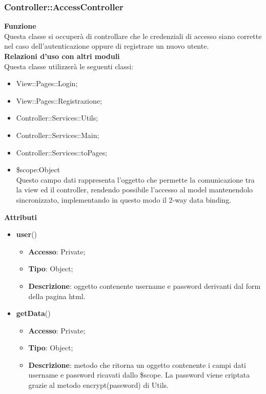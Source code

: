 {	\subsubsection{Controller::\-AccessController}{
		\label{sub:AccessController}
		\textbf{Funzione}\\
			\indent Questa classe si occuperà di controllare che le credenziali di accesso siano corrette nel caso dell'autenticazione oppure di registrare un nuovo utente.\\
		\textbf{Relazioni d'uso con altri moduli}\\
			\indent Questa classe utilizzerà le seguenti classi:
		\begin{itemize}
			\item View::\-Pages::\-Login;
			\item View::\-Pages::\-Registrazione;
			\item Controller::Services::\-Utils;
			\item Controller::Services::\-Main;
			\item Controller::Services::\-toPages;
			\item \$scope:Object\\
	    		\indent Questo campo dati rappresenta l’oggetto che permette la comunicazione tra la view ed il controller, rendendo possibile l’accesso al model mantenendolo sincronizzato, implementando in questo modo il 2-way data binding.
		\end{itemize}
		\textbf{Attributi}\\
	    \begin{itemize}
	    	\item \textbf{user}()
			\begin{itemize}
				\item \textbf{Accesso}: Private;
				\item \textbf{Tipo}: Object;
				\item \textbf{Descrizione}: oggetto contenente username e password derivanti dal form della pagina html.
			\end{itemize}
	    	\item \textbf{getData}()
			\begin{itemize}
				\item \textbf{Accesso}: Private;
				\item \textbf{Tipo}: Object;
				\item \textbf{Descrizione}: metodo che ritorna un oggetto contenente i campi dati username e password ricavati dallo \$scope. La password viene criptata grazie al metodo encrypt(password) di Utils.

\end{itemize}
\end{itemize}}}
